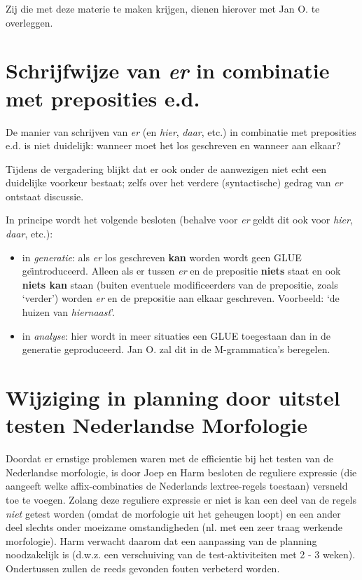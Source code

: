 Zij die met deze materie te maken krijgen, dienen hierover met Jan O. te 
overleggen.

\section {Schrijfwijze van {\em er} in combinatie met preposities e.d.}

De manier van schrijven van {\em er} (en {\em hier}, {\em daar}, etc.)
in combinatie met preposities e.d. is niet 
duidelijk: wanneer moet het los geschreven en wanneer aan elkaar?

Tijdens de vergadering blijkt dat er ook onder de aanwezigen niet echt een 
duidelijke voorkeur bestaat; zelfs over het verdere (syntactische) gedrag van 
{\em er} ontstaat discussie.

In principe wordt het volgende besloten (behalve voor {\em er} geldt dit ook 
voor {\em hier}, {\em daar}, etc.):
  \begin{itemize}
    \item in {\em generatie}: als {\em er} los geschreven {\bf kan} worden 
wordt geen GLUE ge\"{\i}ntroduceerd. Alleen als er tussen {\em er} en de 
prepositie {\bf niets} staat en ook {\bf niets kan} staan (buiten eventuele 
modificeerders van de prepositie, zoals `verder') worden {\em er} en de 
prepositie aan elkaar geschreven. Voorbeeld: `de huizen van {\em hiernaast}'.
    \item in {\em analyse}: hier wordt in meer situaties een GLUE toegestaan 
dan in de generatie geproduceerd. Jan O. zal dit in de M-grammatica's 
beregelen. 
  \end{itemize}

\section {Wijziging in planning door uitstel testen Nederlandse Morfologie}

Doordat er ernstige problemen waren met de efficientie bij het testen van de 
Nederlandse morfologie, is door Joep en Harm 
besloten de reguliere expressie (die aangeeft welke affix-combinaties de
Nederlands lextree-regels toestaan) versneld toe te voegen. Zolang deze 
reguliere expressie er niet is kan een deel van de regels {\em niet} getest 
worden (omdat de morfologie uit het geheugen loopt) en een ander deel slechts 
onder moeizame omstandigheden (nl. met een zeer traag werkende morfologie). 
Harm verwacht daarom dat een aanpassing van de planning noodzakelijk is (d.w.z.
een 
verschuiving van de test-aktiviteiten met 2 - 3 weken). Ondertussen zullen de 
reeds gevonden fouten verbeterd worden.

